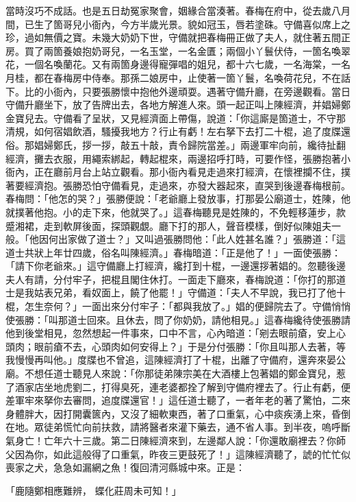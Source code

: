 當時沒巧不成話。也是五日劫冤家聚會，姻緣合當湊著。春梅在府中，從去歲八月間，已生了箇哥兒小衙內，今方半歲光景。貌如冠玉，唇若塗硃。守備喜似席上之珍，過如無價之寶。未幾大奶奶下世，守備就把春梅冊正做了夫人，就住著五間正房。買了兩箇養娘抱奶哥兒，一名玉堂，一名金匱；兩個小丫鬟伏侍，一箇名喚翠花，一個名喚蘭花。又有兩箇身邊得寵彈唱的姐兒，都十六七歲，一名海棠，一名月桂，都在春梅房中侍奉。那孫二娘房中，止使著一箇丫鬟，名喚荷花兒，不在話下。比的小衙內，只要張勝懷中抱他外邊頑耍。遇著守備升廳，在旁邊觀看。當日守備升廳坐下，放了告牌出去，各地方解進人來。頭一起正叫上陳經濟，并娼婦鄭金寶兒去。守備看了呈狀，又見經濟面上帶傷，說道：「你這廝是箇道士，不守那清規，如何宿娼飲酒，騷擾我地方？行止有虧！左右拏下去打二十棍，追了度牒還俗。那娼婦鄭氏，拶一拶，敲五十敲，責令歸院當差。」兩邊軍牢向前，纔待扯翻經濟，攤去衣服，用繩索綁起，轉起棍來，兩邊招呼打時，可要作怪，張勝抱著小衙內，正在廳前月台上站立觀看。那小衙內看見走過來打經濟，在懷裡攔不住，撲著要經濟抱。張勝恐怕守備看見，走過來，亦發大器起來，直哭到後邊春梅根前。春梅問：「他怎的哭？」張勝便說：「老爺廳上發放事，打那晏公廟道士，姓陳，他就撲著他抱。小的走下來，他就哭了。」這春梅聽見是姓陳的，不免輕移蓮步，款蹙湘裙，走到軟屏後面，探頭觀覷。廳下打的那人，聲音模樣，倒好似陳姐夫一般。「他因何出家做了道士？」又叫過張勝問他：「此人姓甚名誰？」張勝道：「這道士共狀上年廿四歲，俗名叫陳經濟。」春梅暗道：「正是他了！」一面使張勝：「請下你老爺來。」這守備廳上打經濟，纔打到十棍，一邊還拶著娼的。忽聽後邊夫人有請，分付牢子，把棍且閣住休打。一面走下廳來，春梅說道：「你打的那道士是我姑表兄弟，看奴面上，饒了他罷！」守備道：「夫人不早說，我已打了他十棍，怎生奈何？」一面出來分付牢子：「都與我放了。」娼的便歸院去了。守備悄悄使張勝：「叫那道士回來。且休去，問了你奶奶，請他相見。」這春梅纔待使張勝請他到後堂相見，忽然想起一件事來，口中不言，心內暗道：「剜去眼前瘡，安上心頭肉；眼前瘡不去，心頭肉如何安得上？」于是分付張勝：「你且叫那人去著，等我慢慢再叫他。」度牒也不曾追，這陳經濟打了十棍，出離了守備府，還奔來晏公廟。不想任道士聽見人來說：「你那徒弟陳宗美在大酒樓上包著娼的鄭金寶兒，惹了酒家店坐地虎劉二，打得臭死，連老婆都拴了解到守備府裡去了。行止有虧，便差軍牢來拏你去審問，追度牒還官！」這任道士聽了，一者年老的著了驚怕，二來身體胖大，因打開囊篋內，又沒了細軟東西，著了口重氣，心中痰疾湧上來，昏倒在地。眾徒弟慌忙向前扶救，請將醫者來灌下藥去，通不省人事。到半夜，嗚呼斷氣身亡！亡年六十三歲。第二日陳經濟來到，左邊鄰人說：「你還敢廟裡去？你師父因為你，如此這般得了口重氣，昨夜三更鼓死了！」這陳經濟聽了，諕的忙忙似喪家之犬，急急如漏網之魚！復回清河縣城中來。正是：

「鹿隨鄭相應難辨，  蝶化莊周未可知！」

